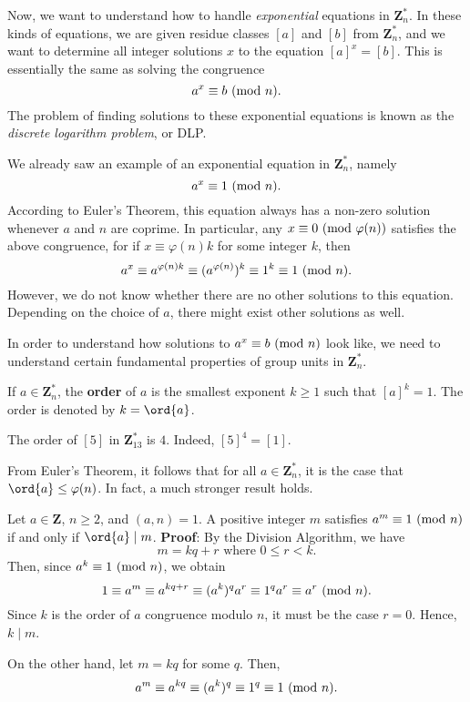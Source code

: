 Now, we want to understand how to handle \emph{exponential} equations in $ \mathbf{Z}_n^* $.
In these kinds of equations, we are given residue classes $ [a] $ and $ [b] $
from $ \mathbf{Z}_n^* $, and we want to determine all integer solutions
$ x $ to the equation $ [a]^x=[b] $. This is essentially the same as solving
the congruence
\[ a^x\equiv b\ (\mathrm{mod}\ n). \]
The problem of finding solutions to these exponential equations is known as the
\emph{discrete logarithm problem}, or DLP\@.
\begin{Example}{}{}
    We already saw an example of an exponential equation in $ \mathbf{Z}_n^* $, namely
    \[ a^x\equiv 1\ (\mathrm{mod}\ n). \]
    According to Euler's Theorem, this equation always has a non-zero solution whenever $ a $ and $ n $ are coprime.
    In particular, any $ x\equiv 0\ (\mathrm{mod}\ \varphi(n)) $ satisfies the above congruence, for if $ x\equiv \varphi(n)k $ for some integer
    $ k $, then
    \[ a^x\equiv a^{\varphi(n)k}\equiv (a^{\varphi(n)})^k\equiv 1^k\equiv 1\ (\mathrm{mod}\ n). \]
    However, we do not know whether there are no other solutions to this equation.
    Depending on the choice of $ a $, there might exist other solutions as well.
\end{Example}
In order to understand how solutions to $ a^x\equiv b\ (\mathrm{mod}\ n) $ look like,
we need to understand certain fundamental properties of group units in $ \mathbf{Z}_n^* $.
\begin{Definition}{}{}
    If $ a\in\mathbf{Z}_n^* $, the \textbf{order} of $ a $ is the smallest exponent $ k\ge 1 $
    such that $ [a]^k=1 $. The order is denoted by $ k=\ord{a} $.
\end{Definition}
\begin{Example}{}{}
    The order of $ [5] $ in $ \mathbf{Z}_{13}^* $ is $ 4 $. Indeed, $ [5]^4=[1] $.
\end{Example}
From Euler's Theorem, it follows that for all $ a\in\mathbf{Z}_n^* $, it is the case that
$ \ord{a}\le \varphi(n) $. In fact, a much stronger result holds.
\begin{Proposition}{}{}
    Let $ a\in\mathbf{Z} $, $ n\ge 2 $, and $ (a,n)=1 $. A positive integer $ m $ satisfies $ a^m\equiv 1\ (\mathrm{mod}\ n) $
    if and only if $ \ord{a}\mid m $.
    \tcblower{}
    \textbf{Proof}: By the Division Algorithm, we have
    \[ m=kq+r\text{ where }0\le r<k. \]
    Then, since $ a^k\equiv 1\ (\mathrm{mod}\ n) $, we obtain
    \[ 1\equiv a^m\equiv a^{kq+r}\equiv (a^k)^q a^r\equiv 1^q a^r\equiv a^r\ (\mathrm{mod}\ n). \]
    Since $ k $ is the order of $ a $ congruence modulo $ n $, it must be the case $ r=0 $. Hence, $ k\mid m $.

    On the other hand, let $ m=kq $ for some $ q $. Then,
    \[ a^m\equiv a^{kq}\equiv (a^k)^q\equiv 1^q\equiv 1\ (\mathrm{mod}\ n). \]
\end{Proposition}
